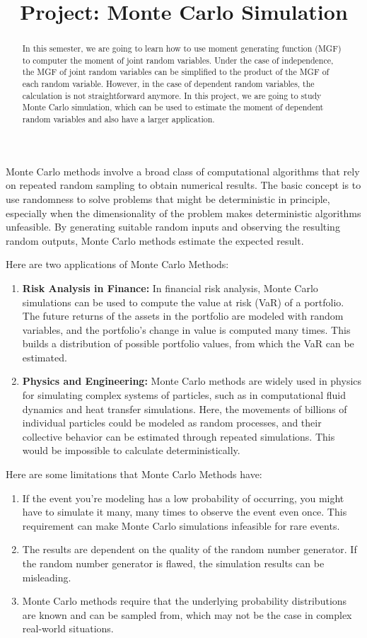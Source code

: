 \documentclass{article}
\title{Project: Monte Carlo Simulation}
\author{}
\date{}
\begin{document}
\maketitle
\begin{abstract}
    In this semester, we are going to learn how to use moment generating function (MGF) to computer the moment of joint random variables. Under the case of independence, the MGF of joint random variables can be simplified to the product of the MGF of each random variable. However, in the case of dependent random variables, the calculation is not straightforward anymore. In this project, we are going to study Monte Carlo simulation, which can be used to estimate the moment of dependent random variables and also have a larger application.
\end{abstract}

Monte Carlo methods involve a broad class of computational algorithms that rely on repeated random sampling to obtain numerical results. The basic concept is to use randomness to solve problems that might be deterministic in principle, especially when the dimensionality of the problem makes deterministic algorithms unfeasible. By generating suitable random inputs and observing the resulting random outputs, Monte Carlo methods estimate the expected result.

Here are two applications of Monte Carlo Methods:
\begin{enumerate}
    \item \textbf{Risk Analysis in Finance:} In financial risk analysis, Monte Carlo simulations can be used to compute the value at risk (VaR) of a portfolio. The future returns of the assets in the portfolio are modeled with random variables, and the portfolio's change in value is computed many times. This builds a distribution of possible portfolio values, from which the VaR can be estimated.
    \item \textbf{Physics and Engineering:} Monte Carlo methods are widely used in physics for simulating complex systems of particles, such as in computational fluid dynamics and heat transfer simulations. Here, the movements of billions of individual particles could be modeled as random processes, and their collective behavior can be estimated through repeated simulations. This would be impossible to calculate deterministically.
\end{enumerate}

Here are some limitations that Monte Carlo Methods have:
\begin{enumerate}
    \item If the event you're modeling has a low probability of occurring, you might have to simulate it many, many times to observe the event even once. This requirement can make Monte Carlo simulations infeasible for rare events.
    \item The results are dependent on the quality of the random number generator. If the random number generator is flawed, the simulation results can be misleading.
    \item Monte Carlo methods require that the underlying probability distributions are known and can be sampled from, which may not be the case in complex real-world situations.
\end{enumerate}
\end{document}
